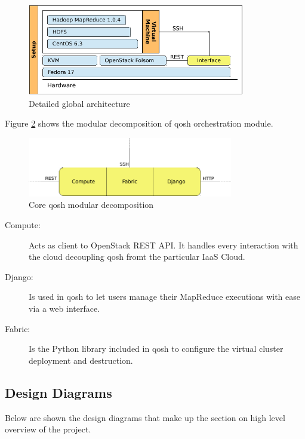 \begin{figure}[tbp]
\begin{center}
\includegraphics[width=0.85\textwidth]{imagenes/022.pdf}
 \caption{Detailed global architecture}
\label{fig:arquitecturadetalle}
\end{center}
\end{figure}

Figure \ref{fig:arquitecturainterfaz} shows the modular decomposition of qosh orchestration module.

\begin{figure}[bp]
\begin{center}
\includegraphics[width=0.8\textwidth]{imagenes/023.pdf}
 \caption{Core qosh modular decomposition}
\label{fig:arquitecturainterfaz}
\end{center}
\end{figure}

\begin{description}
 \item[Compute:] Acts as client to OpenStack REST API. It handles every interaction with the cloud decoupling qosh fromt the particular IaaS Cloud.
 \item[Django:] Is used in qosh to let users manage their MapReduce executions with ease via a web interface.
 \item[Fabric:] Is the Python library included in qosh to configure the virtual cluster deployment and destruction.
\end{description}

\subsection{Design Diagrams}\label{subsec:diagramasaltonivel}
\noindent Below are shown the design diagrams that make up the section on high level overview of the project.

